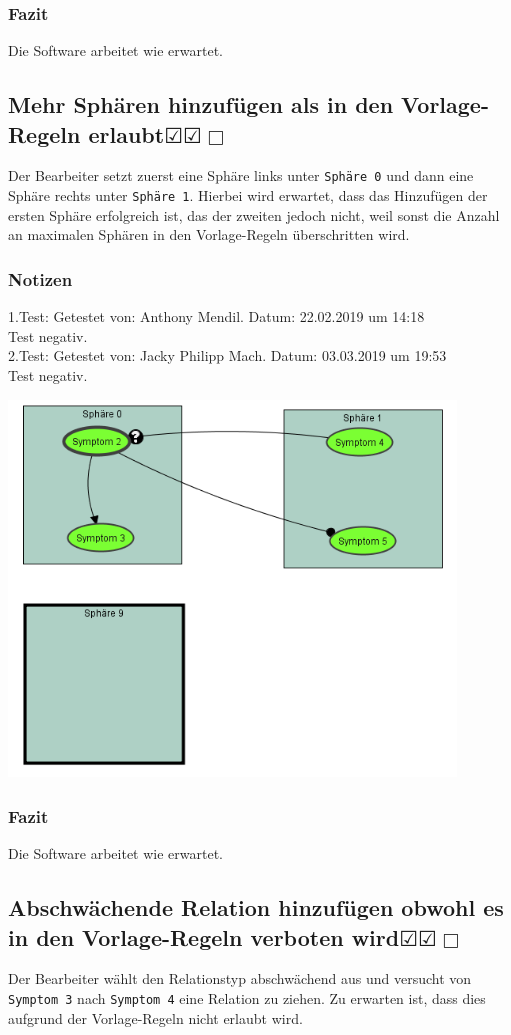 \documentclass[enabledeprecatedfontcommands]{scrartcl}
\newcommand{\subsectiont}[2]{\subsection[#1]{#1{\normalsize\normalfont #2}}}
\newcommand{\leer}{$\Box$}
\newcommand{\ok}{$\CheckedBox$}
\begin{document}
\subsubsection{Fazit}
Die Software arbeitet wie erwartet.

\subsectiont{Mehr Sphären hinzufügen als in den Vorlage-Regeln erlaubt}{\dotfill\ok\ok\leer}
Der Bearbeiter setzt zuerst eine Sphäre links unter \texttt{Sphäre 0} und dann eine Sphäre rechts unter \texttt{Sphäre 1}. Hierbei wird erwartet, dass das Hinzufügen der ersten Sphäre erfolgreich ist, das der zweiten jedoch nicht, weil sonst die Anzahl an maximalen Sphären in den Vorlage-Regeln überschritten wird. 
\subsubsection{Notizen}
1.Test: Getestet von: Anthony Mendil. Datum: 22.02.2019 um 14:18 \\
Test negativ.\\
2.Test: Getestet von: Jacky Philipp Mach. Datum: 03.03.2019 um 19:53 \\
Test negativ.
\begin{center}
\includegraphics[height=10cm]{2_4.PNG}
\end{center}
\subsubsection{Fazit}
Die Software arbeitet wie erwartet.

\subsectiont{Abschwächende Relation hinzufügen obwohl es in den Vorlage-Regeln verboten wird}{\dotfill\ok\ok\leer}
Der Bearbeiter wählt den Relationstyp abschwächend aus und versucht von \texttt{Symptom 3} nach \texttt{Symptom 4} eine Relation zu ziehen. Zu erwarten ist, dass dies aufgrund der Vorlage-Regeln nicht erlaubt wird. 
\end{document}
